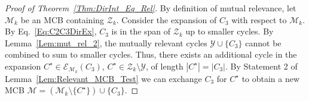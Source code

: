 \documentclass[fleqn,11pt]{article}
\newcommand\calB{\mathcal{B}}
\newcommand\calM{\mathcal{M}}
\newcommand\calX{\mathcal{X}}     %
\newcommand\calY{\mathcal{Y}}
\newcommand\calZ{\mathcal{Z}}
\newcommand\expand[2]{\mathcal{E}_{#1}\left(#2\right)}   %
\begin{document}
\begin{proof}[Proof of Theorem~\ref{Thm:DirInt_Eq_Rel}]
	By definition of mutual relevance, let $\calM_k$ be an MCB containing $\calZ_k$. Consider the expansion of $C_3$ with respect to $\calM_k$. 
	By Eq.~\eqref{Eq:C2C3DirEx}, $C_3$ is in the span of $\calZ_k$ up to smaller cycles.
	By Lemma~\ref{Lem:mut_rel_2}, the mutually relevant cycles $\calY\cup\{C_3\}$ cannot be combined to sum to smaller cycles. Thus, there exists an additional cycle in the expansion $C^\star\in\expand{\calM_k}{C_3}$, $C^\star\in\calZ_k\setminus\calY$, of length $|C^\star|=|C_3|$. By Statement 2 of Lemma~\ref{Lem:Relevant_MCB_Test} we can exchange $C_3$ for $C^\star$ to obtain a new MCB $\calM=(\calM_k\setminus\{C^\star\})\cup\{C_3\}$.
	

\end{proof}
\end{document}
